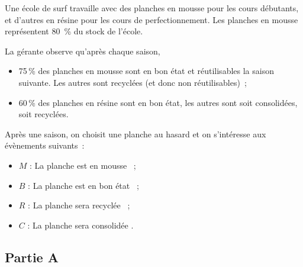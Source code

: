 \medskip

Une école de surf travaille avec des planches en mousse pour les cours débutants, et d'autres en résine pour les cours de perfectionnement. Les planches en mousse représentent 80~\% du stock de l'école.

La gérante observe qu'après chaque saison,
\begin{itemize}[noitemsep]
\item 75\,\% des planches en mousse sont en bon état et réutilisables la saison suivante. Les autres sont recyclées (et donc non réutilisables)~;
\item 60\,\% des planches en résine sont en bon état, les autres sont soit consolidées, soit recyclées.
\end{itemize}

Après une saison, on choisit une planche au hasard et on s'intéresse aux évènements suivants~:
\begin{itemize}[noitemsep]
\item $M$ : \og La planche est en mousse \fg~;
\item $B$ : \og La planche est en bon état \fg~;
\item $R$ : \og La planche sera recyclée \fg~;
\item $C$ : \og La planche sera consolidée \fg.
\end{itemize}

\subsection*{Partie A}

